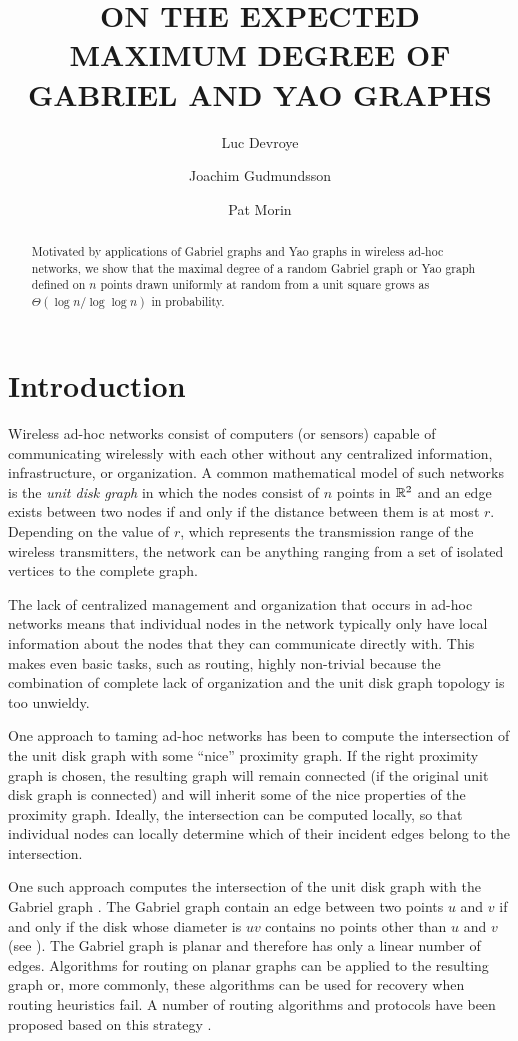 \documentclass[lotsofwhite,charterfonts]{patmorin}
\title{\MakeUppercase{On the Expected Maximum Degree 
	of Gabriel and Yao Graphs}}
\author{Luc Devroye
	\and Joachim Gudmundsson
	\and Pat Morin}
\begin{document}
\maketitle
\begin{abstract}
Motivated by applications of Gabriel graphs and Yao graphs in wireless
ad-hoc networks, we show that the maximal degree of a random Gabriel
graph or Yao graph defined on $n$ points drawn uniformly at random from
a unit square  grows as $\Theta ( \log n / \log \log n)$ in probability.
\end{abstract}

\section{Introduction}

Wireless ad-hoc networks consist of computers (or sensors) capable of
communicating wirelessly with each other without any centralized
information, infrastructure, or organization.  A common mathematical model
of such networks is the \emph{unit disk graph} in which the nodes consist
of $n$ points in $\mathbb{R}^2$ and an edge exists between two nodes if and only if
the distance between them is at most $r$.  Depending on the value of $r$,
which represents the transmission range of the wireless transmitters, the
network can be anything ranging from a set of isolated vertices to the
complete graph.

The lack of centralized management and organization that occurs in ad-hoc
networks means that individual nodes in the network typically only have
local information about the nodes that they can communicate directly with.
This makes even basic tasks, such as routing, highly non-trivial because
the combination of complete lack of organization and the unit disk graph
topology is too unwieldy.

One approach to taming ad-hoc networks has been to compute the
intersection of the unit disk graph with some ``nice'' proximity graph.
If the right proximity graph is chosen, the resulting graph will
remain connected (if the original unit disk graph is connected) and will
inherit some of the nice properties of the proximity graph.   Ideally, the
intersection can be computed locally, so that individual nodes can locally
determine which of their incident edges belong to the intersection.

One such approach computes the intersection of the unit disk graph with
the Gabriel graph \cite{gs69}.  The Gabriel graph contain an edge between
two points $u$ and $v$ if and only if the disk whose diameter is $uv$
contains no points other than $u$ and $v$ (see ).  The
Gabriel graph is planar and therefore has only a linear number of edges.
Algorithms for routing on planar graphs can be applied to the resulting
graph or, more commonly, these algorithms can be used for recovery when
routing heuristics fail.  A number of routing algorithms and protocols
have been proposed based on this strategy \cite{bfno03,bmsu01,kk00}.
\end{document}
